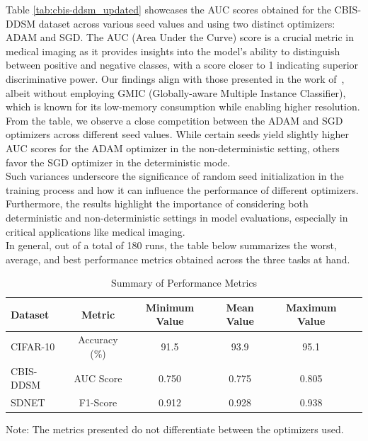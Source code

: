 Table \ref{tab:cbis-ddsm_updated} showcases the AUC scores obtained for the CBIS-DDSM dataset across various seed values and using two distinct optimizers: ADAM and SGD. The AUC (Area Under the Curve) score is a crucial metric in medical imaging as it provides insights into the model's ability to distinguish between positive and negative classes, with a score closer to 1 indicating superior discriminative power.
Our findings align with those presented in the work of~\cite{DBLP:journals/corr/abs-2002-07613}, albeit without employing GMIC (Globally-aware Multiple
Instance Classifier), which is known for its low-memory consumption while enabling higher resolution. From the table, we observe a close competition between the ADAM and SGD optimizers across different seed values. While certain seeds yield slightly higher AUC scores for the ADAM optimizer in the non-deterministic setting, others favor the SGD optimizer in the deterministic mode.\\

Such variances underscore the significance of random seed initialization in the training process and how it can influence the performance of different optimizers. Furthermore, the results highlight the importance of considering both deterministic and non-deterministic settings in model evaluations, especially in critical applications like medical imaging.\\    

In general, out of a total of 180 runs, the table below summarizes the worst, average, and best performance metrics obtained across the three tasks at hand.

\begin{table}[htbp]
  \centering
  \caption{Summary of Performance Metrics}
  \label{tab:performance_summary}
  \begin{tabular}{lccccc}
      \toprule
      Dataset & Metric & Minimum Value & Mean Value & Maximum Value  \\
      \midrule
      CIFAR-10 & Accuracy (\%) & 91.5 & 93.9 & 95.1  \\
      CBIS-DDSM & AUC Score & 0.750 & 0.775 & 0.805  \\
      SDNET & F1-Score & 0.912 & 0.928 & 0.938 \\
      \bottomrule
  \end{tabular}
  \vspace{1em}  %
  \begin{minipage}{\textwidth}
    \small
    Note: The metrics presented do not differentiate between the optimizers used. 
  \end{minipage}
\end{table}

